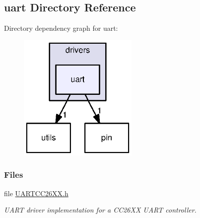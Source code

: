 \subsection{uart Directory Reference}
\label{dir_1b3ab0fb37237467aded6eba32387a0f}
Directory dependency graph for uart\+:
\nopagebreak
\begin{figure}[H]
\begin{center}
\leavevmode
\includegraphics[width=163pt]{dir_1b3ab0fb37237467aded6eba32387a0f_dep}
\end{center}
\end{figure}
\subsubsection*{Files}
\begin{DoxyCompactItemize}
\item 
file \hyperlink{_u_a_r_t_c_c26_x_x_8h}{U\+A\+R\+T\+C\+C26\+X\+X.\+h}
\begin{DoxyCompactList}\small\item\em U\+A\+R\+T driver implementation for a C\+C26\+X\+X U\+A\+R\+T controller. \end{DoxyCompactList}\end{DoxyCompactItemize}
